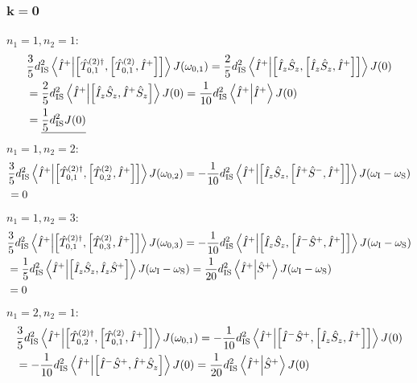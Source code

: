 \begin{appendixtext}
\subsubsection{$\mathbf{k = 0}$}
$n_1 = 1, n_2 = 1$:
\begin{align*}
&\frac{3}{5} d_{\text{IS}}^2 \bra{\hat{I}^+} \ket{\comm{\hat{T}_{0, 1}^{(2) \dagger}}{\comm{\hat{T}_{0,1}^{(2)}}{\hat{I}^+}}} J(\omega_{0,1}) = \frac{2}{5} d_{\text{IS}}^2 \bra{\hat{I}^+} \ket{\comm{\hat{I}_z \hat{S}_z}{\comm{\hat{I}_z \hat{S}_z}{\hat{I}^+}}} J(0) \\
&= \frac{2}{5} d_{\text{IS}}^2 \bra{\hat{I}^+} \ket{\comm{\hat{I}_z \hat{S}_z}{\hat{I}^+ \hat{S}_z}} J(0) = \frac{1}{10} d_{\text{IS}}^2 \bra{\hat{I}^+} \ket{\hat{I}^+} J(0) \\
& = \underline{\frac{1}{5} d_{\text{IS}}^2 J(0)}
\end{align*}
$n_1 = 1, n_2 = 2$:
\begin{align*}
&\frac{3}{5} d_{\text{IS}}^2 \bra{\hat{I}^+} \ket{\comm{\hat{T}_{0,1}^{(2) \dagger}}{\comm{\hat{T}_{0,2}^{(2)}}{\hat{I}^+}}} J(\omega_{0,2}) = -\frac{1}{10} d_{\text{IS}}^2 \bra{\hat{I}^+} \ket{\comm{\hat{I}_z \hat{S}_z}{\comm{\hat{I}^+ \hat{S}^-}{\hat{I}^+}}} J(\omega_{\text{I}} - \omega_{\text{S}}) \\
& = 0
\end{align*}
$n_1 = 1, n_2 = 3$:
\begin{align*}
&\frac{3}{5} d_{\text{IS}}^2 \bra{\hat{I}^+} \ket{\comm{\hat{T}_{0,1}^{(2) \dagger}}{\comm{\hat{T}_{0,3}^{(2)}}{\hat{I}^+}}} J(\omega_{0,3}) = -\frac{1}{10} d_{\text{IS}}^2 \bra{\hat{I}^+} \ket{\comm{\hat{I}_z \hat{S}_z}{\comm{\hat{I}^- \hat{S}^+}{\hat{I}^+}}} J(\omega_{\text{I}} - \omega_{\text{S}}) \\
&= \frac{1}{5} d_{\text{IS}}^2 \bra{\hat{I}^+} \ket{\comm{\hat{I}_z \hat{S}_z}{\hat{I}_z \hat{S}^+}} J(\omega_{\text{I}} - \omega_{\text{S}}) = \frac{1}{20} d_{\text{IS}}^2 \bra{\hat{I}^+} \ket{\hat{S}^+} J(\omega_{\text{I}} - \omega_{\text{S}}) \\
&= 0
\end{align*}
$n_1 = 2, n_2 = 1$:
\begin{align*}
&\frac{3}{5} d_{\text{IS}}^2 \bra{\hat{I}^+} \ket{\comm{\hat{T}_{0,2}^{(2) \dagger}}{\comm{\hat{T}_{0,1}^{(2)}}{\hat{I}^+}}} J(\omega_{0,1}) = -\frac{1}{10} d_{\text{IS}}^2 \bra{\hat{I}^+} \ket{\comm{\hat{I}^- \hat{S}^+}{\comm{\hat{I}_z \hat{S}_z}{\hat{I}^+}}} J(0) \\
&= -\frac{1}{10} d_{\text{IS}}^2 \bra{\hat{I}^+} \ket{\comm{\hat{I}^- \hat{S}^+}{\hat{I}^+ \hat{S}_z}} J(0) = \frac{1}{20} d_{\text{IS}}^2 \bra{\hat{I}^+} \ket{\hat{S}^+} J(0) \\

\end{align*}
\end{appendixtext}
